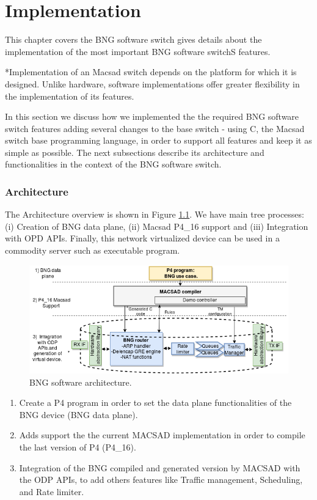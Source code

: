 \chapter{Implementation}
\label{cap:cap04}
This chapter covers the BNG software switch gives details about the implementation of the most important BNG software switchS features.

*Implementation of an Macsad switch depends on the platform for which it is designed. Unlike hardware, software implementations offer greater flexibility in the implementation of its features. %

In this section we discuss how we implemented the the required BNG software switch features adding several changes to the base switch - using C, the Macsad switch base programming language, in order to support all features and keep it as simple as possible. The next subsections describe its architecture and functionalities in the context of the BNG software switch.


\subsection{Architecture}
The Architecture overview is shown in Figure \ref{fig:bng_arch}. We have main tree processes: (i) Creation of BNG data plane, (ii) Macsad P4\_16 support and (iii) Integration with OPD APIs. Finally, this network virtualized device can be used in a commodity server such as executable program.

\begin{figure}[ht]
	\centering
	\includegraphics[width=0.7\linewidth] {figures/bng_arch_0.png}
	\caption{BNG software architecture.}
	\label{fig:bng_arch}
\end{figure}


\begin{enumerate}
	\item Create a P4 program in order to set the data plane functionalities of the BNG device (BNG data plane).   
	\item Adds support the the current MACSAD implementation in order to compile the last version of P4 (P4\_16). 	
	\item Integration of the BNG compiled and generated version by MACSAD with the ODP APIs, to add others features like Traffic management, Scheduling, and Rate limiter.
	
\end{enumerate}

